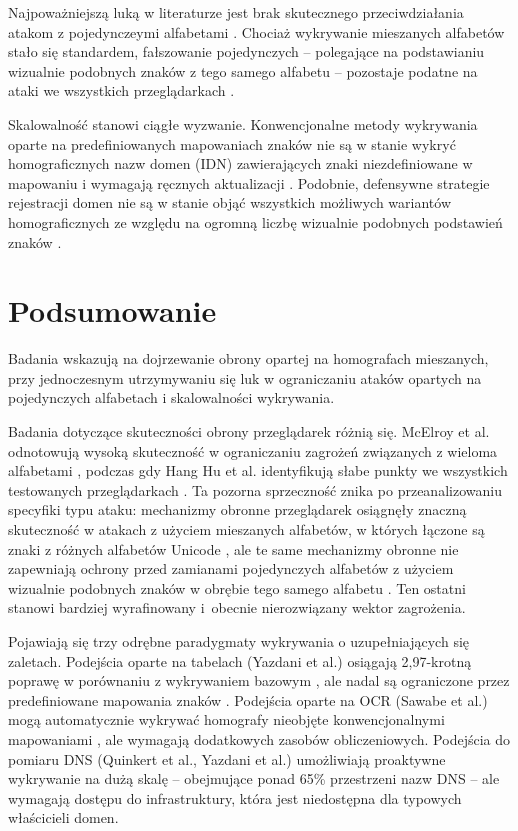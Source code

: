 Najpoważniejszą luką w literaturze jest brak skutecznego przeciwdziałania atakom z pojedynczeymi alfabetami \cite{McElroy2017}. Chociaż wykrywanie mieszanych alfabetów stało się standardem, fałszowanie pojedynczych – polegające na podstawianiu wizualnie podobnych znaków z tego samego alfabetu – pozostaje podatne na ataki we wszystkich przeglądarkach \cite{McElroy2017}.

Skalowalność stanowi ciągłe wyzwanie. Konwencjonalne metody wykrywania oparte na predefiniowanych mapowaniach znaków nie są w stanie wykryć homograficznych nazw domen (IDN) zawierających znaki niezdefiniowane w mapowaniu i wymagają ręcznych aktualizacji \cite{Sawabe2019}. Podobnie, defensywne strategie rejestracji domen nie są w stanie objąć wszystkich możliwych wariantów homograficznych ze względu na ogromną liczbę wizualnie podobnych podstawień znaków \cite{Quinkert}.

\section{Podsumowanie}
Badania wskazują na dojrzewanie obrony opartej na homografach mieszanych, przy jednoczesnym utrzymywaniu się luk w ograniczaniu ataków opartych na pojedynczych alfabetach i skalowalności wykrywania.

Badania dotyczące skuteczności obrony przeglądarek różnią się. McElroy et al. odnotowują wysoką skuteczność w ograniczaniu zagrożeń związanych z wieloma alfabetami \cite{McElroy2017}, podczas gdy Hang Hu et al. identyfikują słabe punkty we wszystkich testowanych przeglądarkach \cite{Hu2021}. Ta pozorna sprzeczność znika po przeanalizowaniu specyfiki typu ataku: mechanizmy obronne przeglądarek osiągnęły znaczną skuteczność w atakach z użyciem mieszanych alfabetów, w których łączone są znaki z różnych alfabetów Unicode \cite{McElroy2017}, ale te same mechanizmy obronne nie zapewniają ochrony przed zamianami pojedynczych alfabetów z użyciem wizualnie podobnych znaków w obrębie tego samego alfabetu \cite{McElroy2017}. Ten ostatni stanowi bardziej wyrafinowany i~obecnie nierozwiązany wektor zagrożenia.

Pojawiają się trzy odrębne paradygmaty wykrywania o uzupełniających się zaletach. Podejścia oparte na tabelach (Yazdani et al.) osiągają 2,97-krotną poprawę w porównaniu z wykrywaniem bazowym \cite{Yazdani2020}, ale nadal są ograniczone przez predefiniowane mapowania znaków \cite{Sawabe2019}. Podejścia oparte na OCR (Sawabe et al.) mogą automatycznie wykrywać homografy nieobjęte konwencjonalnymi mapowaniami \cite{Sawabe2019}, ale wymagają dodatkowych zasobów obliczeniowych. Podejścia do pomiaru DNS (Quinkert et al., Yazdani et al.) umożliwiają proaktywne wykrywanie na dużą skalę – obejmujące ponad 65\% przestrzeni nazw DNS \cite{Yazdani2020} – ale wymagają dostępu do infrastruktury, która jest niedostępna dla typowych właścicieli domen.

